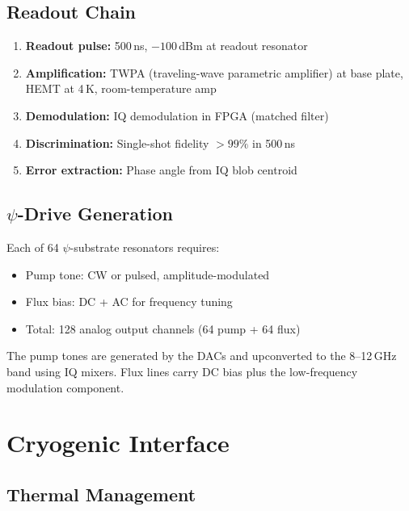 \documentclass[11pt,letterpaper]{article}
\begin{document}
\subsection{Readout Chain}

\begin{enumerate}
\item \textbf{Readout pulse:} 500\,ns, $-100$\,dBm at readout resonator
\item \textbf{Amplification:} TWPA (traveling-wave parametric amplifier)
at base plate, HEMT at 4\,K, room-temperature amp
\item \textbf{Demodulation:} IQ demodulation in FPGA (matched filter)
\item \textbf{Discrimination:} Single-shot fidelity $>99\%$ in 500\,ns
\item \textbf{Error extraction:} Phase angle from IQ blob centroid
\end{enumerate}

\subsection{$\psi$-Drive Generation}

Each of 64 $\psi$-substrate resonators requires:
\begin{itemize}
\item Pump tone: CW or pulsed, amplitude-modulated
\item Flux bias: DC + AC for frequency tuning
\item Total: 128 analog output channels (64 pump + 64 flux)
\end{itemize}

The pump tones are generated by the DACs and upconverted to the 8--12\,GHz
band using IQ mixers. Flux lines carry DC bias plus the low-frequency
modulation component.

\section{Cryogenic Interface}

\subsection{Thermal Management}
\end{document}
